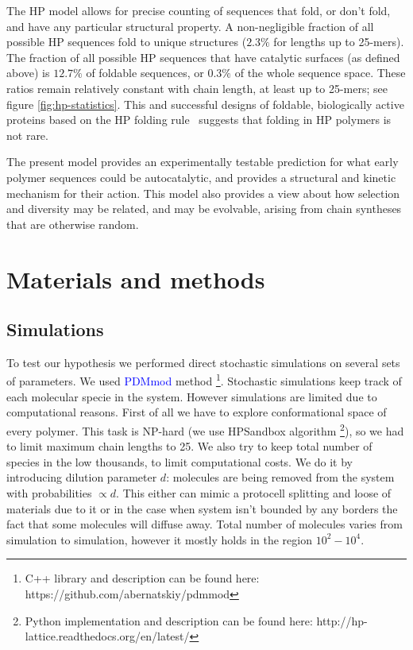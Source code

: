 \documentclass[journal=jacsat,manuscript=article,layout=twocolumn]{achemso}
\newcommand*{\blue}[1]{\textcolor{blue}{#1}}
\begin{document}
 The HP model allows for precise counting of sequences that fold, or don't fold, 
 and have any particular structural property.  A non-negligible fraction of all possible HP 
sequences fold to unique structures ($2.3\% $ for lengths up to 25-mers).  The fraction of all 
possible HP sequences that have catalytic surfaces (as defined above) is $12.7\%$ of foldable 
sequences, or $0.3\%$ of the whole sequence space.  These ratios remain relatively constant with 
chain length, at least up to 25-mers; see figure \ref{fig:hp-statistics}.  This and successful 
designs of foldable, biologically active proteins based on the HP folding rule~\cite{Murphy2015} 
suggests that folding in HP polymers is not rare.  
 
  The present model provides an experimentally testable prediction for what early 
  polymer sequences could be autocatalytic, and provides a structural and kinetic mechanism for 
their action.  This model also provides a view about how selection and diversity may be related, 
and 
may be evolvable, arising from chain syntheses that are otherwise random.








\section{Materials and methods}\label{sec:mat}
\subsection{Simulations}\label{sec:mat-sim}
To test our hypothesis we performed direct stochastic simulations on several sets of parameters. We 
used 
\blue{PDMmod} method \cite{Bernatskiy}
\footnote{C++ library and description can be found here: https://github.com/abernatskiy/pdmmod}. 
Stochastic simulations keep track of each 
molecular specie in the system. However simulations are limited due to computational reasons. 
First of all we have to explore conformational space of every polymer. This task is NP-hard (we use 
HPSandbox algorithm\cite{lau1989lattice,Dill2008} \footnote{Python implementation and description 
can be found here: http://hp-lattice.readthedocs.org/en/latest/}), so we had to limit 
maximum chain lengths to 25. We also try to keep total number of species in the low thousands, to 
limit computational costs. We do it by introducing dilution parameter $d$: molecules are being 
removed from the system with probabilities $\propto d$. 
This either can mimic a protocell splitting and loose of materials due to it or in the case when 
system isn't bounded by any borders the fact that some molecules will diffuse away. Total number of 
molecules varies from simulation to simulation, 
however it mostly holds in the region $10^2-10^4$.
\end{document}
